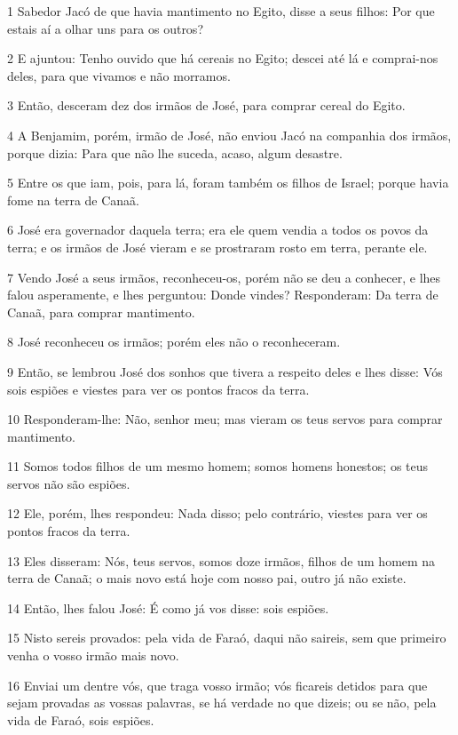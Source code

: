 \par 1 Sabedor Jacó de que havia mantimento no Egito, disse a seus filhos: Por que estais aí a olhar uns para os outros?
\par 2 E ajuntou: Tenho ouvido que há cereais no Egito; descei até lá e comprai-nos deles, para que vivamos e não morramos.
\par 3 Então, desceram dez dos irmãos de José, para comprar cereal do Egito.
\par 4 A Benjamim, porém, irmão de José, não enviou Jacó na companhia dos irmãos, porque dizia: Para que não lhe suceda, acaso, algum desastre.
\par 5 Entre os que iam, pois, para lá, foram também os filhos de Israel; porque havia fome na terra de Canaã.
\par 6 José era governador daquela terra; era ele quem vendia a todos os povos da terra; e os irmãos de José vieram e se prostraram rosto em terra, perante ele.
\par 7 Vendo José a seus irmãos, reconheceu-os, porém não se deu a conhecer, e lhes falou asperamente, e lhes perguntou: Donde vindes? Responderam: Da terra de Canaã, para comprar mantimento.
\par 8 José reconheceu os irmãos; porém eles não o reconheceram.
\par 9 Então, se lembrou José dos sonhos que tivera a respeito deles e lhes disse: Vós sois espiões e viestes para ver os pontos fracos da terra.
\par 10 Responderam-lhe: Não, senhor meu; mas vieram os teus servos para comprar mantimento.
\par 11 Somos todos filhos de um mesmo homem; somos homens honestos; os teus servos não são espiões.
\par 12 Ele, porém, lhes respondeu: Nada disso; pelo contrário, viestes para ver os pontos fracos da terra.
\par 13 Eles disseram: Nós, teus servos, somos doze irmãos, filhos de um homem na terra de Canaã; o mais novo está hoje com nosso pai, outro já não existe.
\par 14 Então, lhes falou José: É como já vos disse: sois espiões.
\par 15 Nisto sereis provados: pela vida de Faraó, daqui não saireis, sem que primeiro venha o vosso irmão mais novo.
\par 16 Enviai um dentre vós, que traga vosso irmão; vós ficareis detidos para que sejam provadas as vossas palavras, se há verdade no que dizeis; ou se não, pela vida de Faraó, sois espiões.
